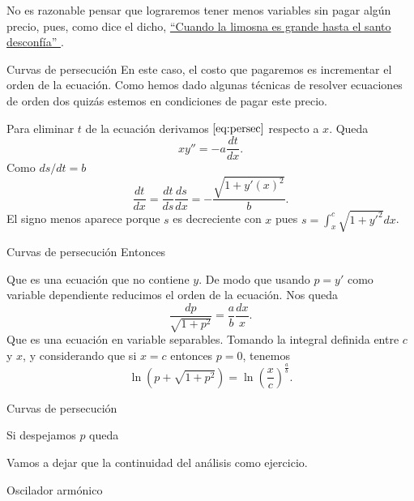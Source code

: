 \documentclass{article}
\begin{document}
  No es razonable pensar que lograremos tener menos variables sin pagar algún precio, pues, como dice el dicho, 
 \href{http://es.answers.yahoo.com/question/index?qid=20081023132736AABMX0}{``Cuando la limosna es grande hasta el santo desconfía'' }. 


{Curvas de persecución}
 En este caso, el costo que pagaremos 
 es incrementar el orden de la ecuación. 
 Como hemos dado algunas técnicas de  resolver ecuaciones de orden dos quizás estemos en condiciones de pagar este precio.
 
Para eliminar $t$ de la ecuación derivamos $\eqref{eq:persec}$ respecto a $x$. Queda
\[xy''=-a\frac{dt}{dx}.\]
Como $ds/dt=b$ 
\[\frac{dt}{dx}=\frac{dt}{ds}\frac{ds}{dx}=-\frac{\sqrt{1+y'(x)^2}}{b}.\]
El signo menos aparece porque $s$ es decreciente con $x$ pues $s=\int_x^c\sqrt{1+y'^2}dx$.
 


{Curvas de persecución}
 Entonces 
 
Que es una ecuación que no contiene $y$. De modo que usando $p=y'$ como variable dependiente reducimos el orden de la ecuación. Nos queda
\[\frac{dp}{\sqrt{1+p^2}}=\frac{a}{b}\frac{dx}{x}.\]
Que es una ecuación en variable separables. Tomando la integral definida entre $c$ y $x$, y considerando que si $x=c$ entonces $p=0$, tenemos
\[\ln\left(p+\sqrt{1+p^2}\right)=\ln\left( \frac{x}{c}\right)^{\tfrac{a}{b}}.\]
 
 


{Curvas de persecución}

Si despejamos $p$ queda


Vamos a dejar que la continuidad del análisis como ejercicio.
 
 


{Oscilador armónico}\label{resortito}
\end{document}
